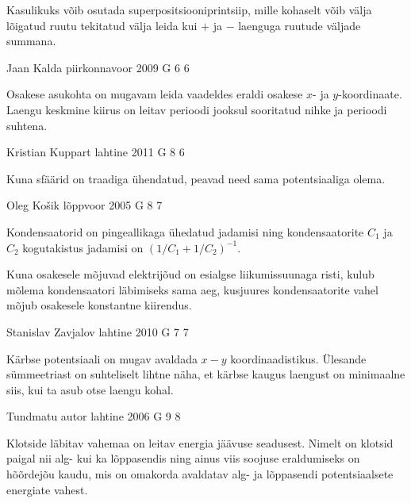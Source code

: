 \documentclass[11pt]{article}
\begin{document}
{{\ifHint
Kasulikuks võib osutada superpositsiooniprintsiip, mille kohaselt võib välja lõigatud ruutu tekitatud välja leida kui $+$ ja $-$ laenguga ruutude väljade summana.
\fi
}

{Jaan Kalda} %
{piirkonnavoor} %
{2009} %
{G 6} %
{6} %
{

\ifHint
Osakese asukohta on mugavam leida vaadeldes eraldi osakese $x$- ja $y$-koordinaate. Laengu keskmine kiirus on leitav perioodi jooksul sooritatud nihke ja perioodi suhtena.
\fi
}

{Kristian Kuppart} %
{lahtine} %
{2011} %
{G 8} %
{6} %
{

\ifHint
Kuna sfäärid on traadiga ühendatud, peavad need sama potentsiaaliga olema.
\fi
}

{Oleg Košik} %
{lõppvoor} %
{2005} %
{G 8} %
{7} %
{

\ifHint
Kondensaatorid on pingeallikaga ühedatud jadamisi ning kondensaatorite $C_1$ ja $C_2$ kogutakistus jadamisi on $\left( 1/C_1 + 1/C_2 \right) ^{-1}$. 

Kuna osakesele mõjuvad elektrijõud on esialgse liikumissuunaga risti, kulub mõlema kondensaatori läbimiseks sama aeg, kusjuures kondensaatorite vahel mõjub osakesele konstantne kiirendus.
\fi
}

{Stanislav Zavjalov} %
{lahtine} %
{2010} %
{G 7} %
{7} %
{

\ifHint
Kärbse potentsiaali on mugav avaldada $x-y$ koordinaadistikus. Ülesande sümmeetriast on suhteliselt lihtne näha, et kärbse kaugus laengust on minimaalne siis, kui ta asub otse laengu kohal.
\fi
}

{Tundmatu autor} %
{lahtine} %
{2006} %
{G 9} %
{8} %
{

\ifHint
Klotside läbitav vahemaa on leitav energia jäävuse seadusest. Nimelt on klotsid paigal nii alg- kui ka lõppasendis ning ainus viis soojuse eraldumiseks on hõõrdejõu kaudu, mis on omakorda avaldatav alg- ja lõppasendi potentsiaalsete energiate vahest.
\fi
}

}
\end{document}
